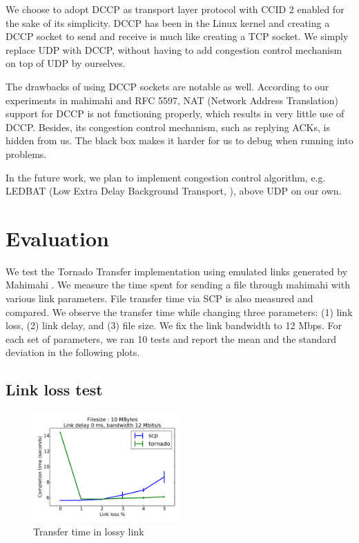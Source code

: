 \documentclass{sig-alternate-10pt}
\begin{document}
We choose to adopt DCCP as transport layer protocol with CCID 2 enabled for the
sake of its simplicity. DCCP has been in the Linux kernel and creating a DCCP
socket to send and receive is much like creating a TCP socket. We simply replace
UDP with DCCP, without having to add congestion control mechanism on top of UDP
by ourselves.

The drawbacks of using DCCP sockets are notable as well. According to our
experiments in mahimahi and RFC 5597, NAT (Network Address Translation) support
for DCCP is not functioning properly, which results in very little use of DCCP.
Besides, its congestion control mechanism, such as replying ACKs, is hidden from
us. The black box makes it harder for us to debug when running into problems.

In the future work, we plan to implement congestion control algorithm, e.g.
LEDBAT (Low Extra Delay Background Transport, \cite{ledbat}), above UDP on our own.

\section{Evaluation} \label{s:eval}
We test the Tornado Transfer implementation using emulated links generated by
Mahimahi \cite{mahimahi}. We measure the time spent for sending a file through
mahimahi with various link parameters. File transfer time via SCP is also
measured and compared. We observe the transfer time while changing three
parameters: (1) link loss, (2) link delay, and (3) file size. We fix the link
bandwidth to 12 Mbps. For each set of parameters, we ran 10 tests and report the
mean and the standard deviation in the following plots.

\subsection{Link loss test}

\begin{figure}[t]
  \centering
  \includegraphics[width=0.5\textwidth]{loss-plot}
  \caption{Transfer time in lossy link}
  \label{f:loss-plot}
\end{figure}
\end{document}
